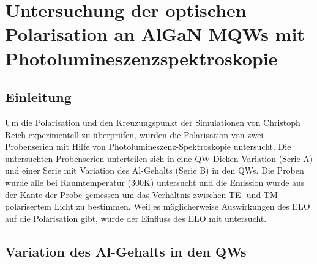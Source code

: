 \thispagestyle{fancy}

\chapter{Untersuchung der optischen Polarisation an AlGaN MQWs mit Photolumineszenzspektroskopie}
\label{chap:pol}
\section{Einleitung}
Um die Polarisation und den Kreuzungspunkt der Simulationen von Christoph Reich experimentell zu \"uberpr\"ufen, wurden die Polarisation von zwei Probenserien mit Hilfe von Photolumineszenz-Spektroskopie untersucht. Die untersuchten Probenserien unterteilen sich in eine QW-Dicken-Variation (Serie A) und einer Serie mit Variation des Al-Gehalts (Serie B) in den QWs. 
Die Proben wurde alle bei Raumtemperatur (300K) untersucht und die Emission wurde aus der Kante der Probe gemessen um das Verhältnis zwischen TE- und TM-polarisertem Licht zu bestimmen. Weil es m\"oglicherweise Auswirkungen des ELO auf die Polarisation gibt, wurde der Einfluss des ELO mit untersucht. 

\section{Variation des Al-Gehalts in den QWs}

